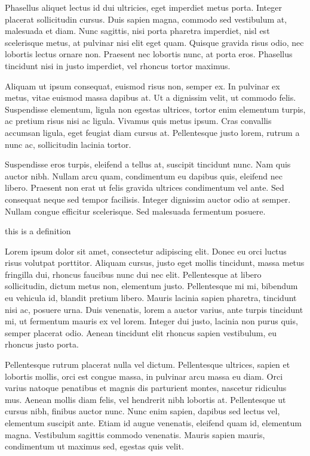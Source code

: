 Phasellus aliquet lectus id dui ultricies, eget imperdiet metus porta. Integer placerat sollicitudin cursus. Duis sapien magna, commodo sed vestibulum at, malesuada et diam. Nunc sagittis, nisi porta pharetra imperdiet, nisl est scelerisque metus, at pulvinar nisi elit eget quam. Quisque gravida risus odio, nec lobortis lectus ornare non. Praesent nec lobortis nunc, at porta eros. Phasellus tincidunt nisi in justo imperdiet, vel rhoncus tortor maximus.

Aliquam ut ipsum consequat, euismod risus non, semper ex. In pulvinar ex metus, vitae euismod massa dapibus at. Ut a dignissim velit, ut commodo felis. Suspendisse elementum, ligula non egestas ultrices, tortor enim elementum turpis, ac pretium risus nisi ac ligula. Vivamus quis metus ipsum. Cras convallis accumsan ligula, eget feugiat diam cursus at. Pellentesque justo lorem, rutrum a nunc ac, sollicitudin lacinia tortor.

Suspendisse eros turpis, eleifend a tellus at, suscipit tincidunt nunc. Nam quis auctor nibh. Nullam arcu quam, condimentum eu dapibus quis, eleifend nec libero. Praesent non erat ut felis gravida ultrices condimentum vel ante. Sed consequat neque sed tempor facilisis. Integer dignissim auctor odio at semper. Nullam congue efficitur scelerisque. Sed malesuada fermentum posuere.

\begin{defn}
     this is a definition
\end{defn}

Lorem ipsum dolor sit amet, consectetur adipiscing elit. Donec eu orci luctus risus volutpat porttitor. Aliquam cursus, justo eget mollis tincidunt, massa metus fringilla dui, rhoncus faucibus nunc dui nec elit. Pellentesque at libero sollicitudin, dictum metus non, elementum justo. Pellentesque mi mi, bibendum eu vehicula id, blandit pretium libero. Mauris lacinia sapien pharetra, tincidunt nisi ac, posuere urna. Duis venenatis, lorem a auctor varius, ante turpis tincidunt mi, ut fermentum mauris ex vel lorem. Integer dui justo, lacinia non purus quis, semper placerat odio. Aenean tincidunt elit rhoncus sapien vestibulum, eu rhoncus justo porta.

Pellentesque rutrum placerat nulla vel dictum. Pellentesque ultrices, sapien et lobortis mollis, orci est congue massa, in pulvinar arcu massa eu diam. Orci varius natoque penatibus et magnis dis parturient montes, nascetur ridiculus mus. Aenean mollis diam felis, vel hendrerit nibh lobortis at. Pellentesque ut cursus nibh, finibus auctor nunc. Nunc enim sapien, dapibus sed lectus vel, elementum suscipit ante. Etiam id augue venenatis, eleifend quam id, elementum magna. Vestibulum sagittis commodo venenatis. Mauris sapien mauris, condimentum ut maximus sed, egestas quis velit.

